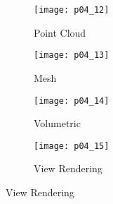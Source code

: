 \begin{figure}
    \begin{subfigure}{0.23\textwidth}
        \texttt{[image: p04\_12]}
        \caption{Point Cloud}
    \end{subfigure}
    \begin{subfigure}{0.23\textwidth}
        \texttt{[image: p04\_13]}
        \caption{Mesh}
    \end{subfigure}
    \begin{subfigure}{0.23\textwidth}
        \texttt{[image: p04\_14]}
        \caption{Volumetric}
    \end{subfigure}
    \hspace{1mm}
    \begin{subfigure}{0.23\textwidth}
        \texttt{[image: p04\_15]}
        \caption{View Rendering}
    \end{subfigure}
\end{figure}

